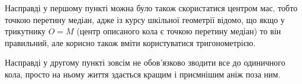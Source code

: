 \begin{side_comment}
    Насправді у першому пункті можна було також скористатися центром мас, тобто точкою перетину медіан, адже із курсу шкільної геометрії відомо, що якщо у трикутнику $O=M$ (центр описаного кола є точкою перетину медіан) то він правильний, але корисно також вміти користуватися тригонометрією.
\end{side_comment}
\begin{side_comment}
    Насправді у другому пункті зовсім не обов'язково зводити все до одиничного кола, просто на ньому життя здається кращим і приємнішим аніж поза ним.
\end{side_comment}

